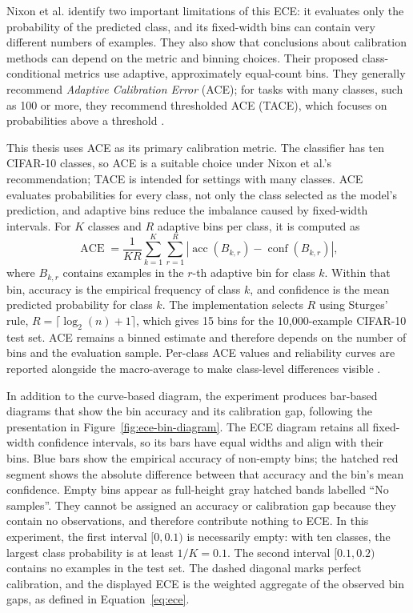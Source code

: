 \documentclass[12pt,a4paper]{article}
\begin{document}
Nixon et al. identify two important limitations of this ECE: it evaluates only the probability of the predicted class, and its fixed-width bins can contain very different numbers of examples. They also show that conclusions about calibration methods can depend on the metric and binning choices. Their proposed class-conditional metrics use adaptive, approximately equal-count bins. They generally recommend \emph{Adaptive Calibration Error} (ACE); for tasks with many classes, such as 100 or more, they recommend thresholded ACE (TACE), which focuses on probabilities above a threshold \cite{nixon2019measuring}.

This thesis uses ACE as its primary calibration metric. The classifier has ten CIFAR-10 classes, so ACE is a suitable choice under Nixon et al.'s recommendation; TACE is intended for settings with many classes. ACE evaluates probabilities for every class, not only the class selected as the model's prediction, and adaptive bins reduce the imbalance caused by fixed-width intervals. For $K$ classes and $R$ adaptive bins per class, it is computed as
\begin{equation}
    \operatorname{ACE}=\frac{1}{KR}\sum_{k=1}^{K}\sum_{r=1}^{R}
    \left|\operatorname{acc}(B_{k,r})-\operatorname{conf}(B_{k,r})\right|,
    \label{eq:ace}
\end{equation}
where $B_{k,r}$ contains examples in the $r$-th adaptive bin for class $k$. Within that bin, accuracy is the empirical frequency of class $k$, and confidence is the mean predicted probability for class $k$. The implementation selects $R$ using Sturges' rule, $R=\lceil\log_2(n)+1\rceil$, which gives 15 bins for the 10,000-example CIFAR-10 test set. ACE remains a binned estimate and therefore depends on the number of bins and the evaluation sample. Per-class ACE values and reliability curves are reported alongside the macro-average to make class-level differences visible \cite{nixon2019measuring}.

In addition to the curve-based diagram, the experiment produces bar-based diagrams that show the bin accuracy and its calibration gap, following the presentation in Figure~\ref{fig:ece-bin-diagram}. The ECE diagram retains all fixed-width confidence intervals, so its bars have equal widths and align with their bins. Blue bars show the empirical accuracy of non-empty bins; the hatched red segment shows the absolute difference between that accuracy and the bin's mean confidence. Empty bins appear as full-height gray hatched bands labelled ``No samples''. They cannot be assigned an accuracy or calibration gap because they contain no observations, and therefore contribute nothing to ECE. In this experiment, the first interval $[0,0.1)$ is necessarily empty: with ten classes, the largest class probability is at least $1/K=0.1$. The second interval $[0.1,0.2)$ contains no examples in the test set. The dashed diagonal marks perfect calibration, and the displayed ECE is the weighted aggregate of the observed bin gaps, as defined in Equation~\eqref{eq:ece}.
\end{document}
